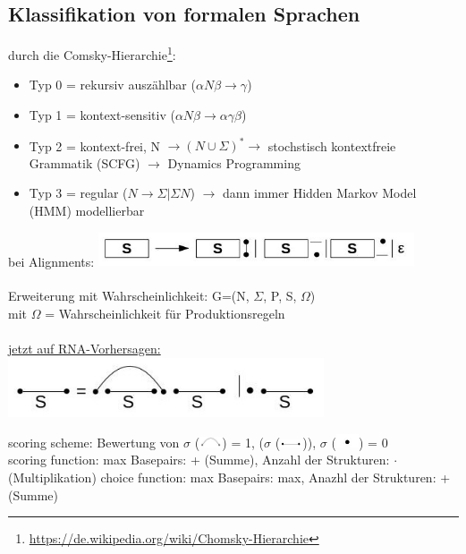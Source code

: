 \documentclass[12pt]{article}
\begin{document}
\subsection{Klassifikation von formalen Sprachen}
durch die Comsky-Hierarchie\footnote{\url{https://de.wikipedia.org/wiki/Chomsky-Hierarchie}}:
\begin{itemize}
	\item Typ 0 = rekursiv auszählbar ($\alpha N \beta \to \gamma$)
	\item Typ 1 = kontext-sensitiv ($\alpha N \beta \to \alpha \gamma \beta$)
	\item Typ 2 = kontext-frei, N $\to (N \cup \Sigma)^* \to$ stochstisch kontextfreie Grammatik (SCFG) $\to$ Dynamics Programming
	\item Typ 3 = regular ($N \to \Sigma | \Sigma N$) $\to$ dann immer Hidden Markov Model (HMM) modellierbar
\end{itemize}

bei Alignments:
\includegraphics[width=0.7\textwidth]{rna_and_protein_src/1.jpg}
\\\\
Erweiterung mit Wahrscheinlichkeit:
G=(N, $\Sigma$, P, S, $\Omega$)\\
mit $\Omega$ = Wahrscheinlichkeit für Produktionsregeln\\
\\

\underline{jetzt auf RNA-Vorhersagen:}\\
\includegraphics[width=0.7\textwidth]{rna_and_protein_src/2.jpg}

scoring scheme: Bewertung von 
$\sigma$ (\includegraphics[width=0.05\textwidth]{rna_and_protein_src/4.jpg}) = 1, 
($\sigma$ (\includegraphics[width=0.05\textwidth]{rna_and_protein_src/3.jpg})), 
$\sigma$ (\includegraphics[width=0.05\textwidth]{rna_and_protein_src/5.jpg}) = 0\\
scoring function: max Basepairs: + (Summe), Anzahl der Strukturen: $\cdot$ (Multiplikation)
choice function: max Basepairs: max, Anazhl der Strukturen: + (Summe)
\end{document}
